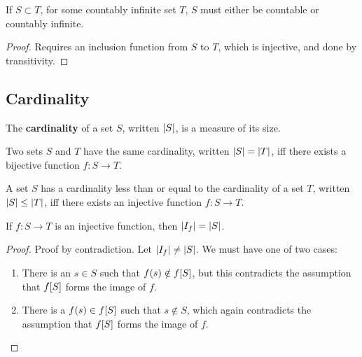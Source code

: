 \begin{theorem} \label{thm:subset-of-countably-infinite} If $S\subset T$, for
some countably infinite set $T$, $S$ must either be countable or countably
infinite. \end{theorem}

\begin{proof} Requires an inclusion function from $S$ to $T$, which is
injective, and done by transitivity. \end{proof}

\subsection{Cardinality}

\begin{notion} The \textbf{cardinality} of a set $S$, written $\mathopen{}\left|{S}\right|\mathclose{}$, is a
measure of its size. \end{notion}

\begin{definition} \label{def:same-card} Two sets $S$ and $T$ have the same
cardinality, written $\mathopen{}\left|{S}\right|\mathclose{}=\mathopen{}\left|{T}\right|\mathclose{}$, iff there exists a bijective function
$f : S\rightarrow T$.\end{definition}

\begin{definition} \label{def:leq-card} A set $S$ has a cardinality less than
or equal to the cardinality of a set $T$, written $\mathopen{}\left|{S}\right|\mathclose{}\leq\mathopen{}\left|{T}\right|\mathclose{}$, iff
there exists an injective function $f : S \rightarrow T$.\end{definition}

\begin{theorem} \label{thm:injective-image-card} If $f : S \rightarrow T$ is an
injective function, then $\mathopen{}\left|{I_f}\right|\mathclose{}=\mathopen{}\left|{S}\right|\mathclose{}$. \end{theorem}

\begin{proof} Proof by contradiction. Let $\mathopen{}\left|{I_f}\right|\mathclose{} \neq \mathopen{}\left|{S}\right|\mathclose{}$. We
must have one of two cases: 

\begin{enumerate}

\item There is an $s\in S$ such that $f\mathopen{}\left({s}\right)\mathclose{}\notin f\mathopen{}\left[{S}\right]\mathclose{}$, but this
contradicts the assumption that $f\mathopen{}\left[{S}\right]\mathclose{}$ forms the image of $f$.

\item There is a $f\mathopen{}\left({s}\right)\mathclose{}\in f\mathopen{}\left[{S}\right]\mathclose{}$ such that $s\notin S$, which again
contradicts the assumption that $f\mathopen{}\left[{S}\right]\mathclose{}$ forms the image of $f$. 

\end{enumerate}

\end{proof}

